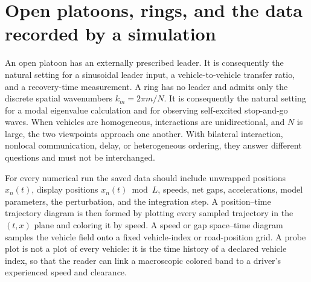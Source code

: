 \documentclass[11pt,a4paper,openany]{book}
\numberwithin{equation}{chapter}
\numberwithin{figure}{chapter}
\numberwithin{table}{chapter}
\begin{document}
\section{Open platoons, rings, and the data recorded by a simulation}
An open platoon has an externally prescribed leader. It is consequently the natural setting for a sinusoidal leader input, a vehicle-to-vehicle transfer ratio, and a recovery-time measurement. A ring has no leader and admits only the discrete spatial wavenumbers $k_m=2\pi m/N$. It is consequently the natural setting for a modal eigenvalue calculation and for observing self-excited stop-and-go waves. When vehicles are homogeneous, interactions are unidirectional, and $N$ is large, the two viewpoints approach one another. With bilateral interaction, nonlocal communication, delay, or heterogeneous ordering, they answer different questions and must not be interchanged.

For every numerical run the saved data should include unwrapped positions $x_n(t)$, display positions $x_n(t)\bmod L$, speeds, net gaps, accelerations, model parameters, the perturbation, and the integration step. A position--time trajectory diagram is then formed by plotting every sampled trajectory in the $(t,x)$ plane and coloring it by speed. A speed or gap space--time diagram samples the vehicle field onto a fixed vehicle-index or road-position grid. A probe plot is not a plot of every vehicle: it is the time history of a declared vehicle index, so that the reader can link a macroscopic colored band to a driver's experienced speed and clearance.
\end{document}
